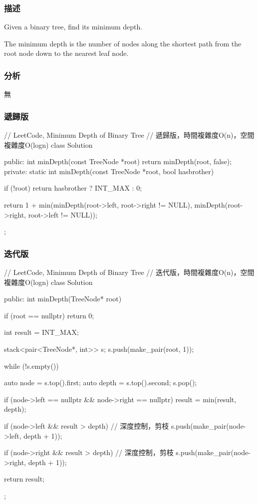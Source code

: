 \subsubsection{描述}
Given a binary tree, find its minimum depth.

The minimum depth is the number of nodes along the shortest path from the root node down to the nearest leaf node.


\subsubsection{分析}
無


\subsubsection{遞歸版}
\begin{Code}
// LeetCode, Minimum Depth of Binary Tree
// 遞歸版，時間複雜度O(n)，空間複雜度O(logn)
class Solution {
public:
    int minDepth(const TreeNode *root) {
        return minDepth(root, false);
    }
private:
    static int minDepth(const TreeNode *root, bool hasbrother) {
        if (!root) return hasbrother ? INT_MAX : 0;

        return 1 + min(minDepth(root->left, root->right != NULL),
                minDepth(root->right, root->left != NULL));
    }
};
\end{Code}


\subsubsection{迭代版}
\begin{Code}
// LeetCode, Minimum Depth of Binary Tree
// 迭代版，時間複雜度O(n)，空間複雜度O(logn)
class Solution {
public:
    int minDepth(TreeNode* root) {
        if (root == nullptr)
            return 0;

        int result = INT_MAX;

        stack<pair<TreeNode*, int>> s;
        s.push(make_pair(root, 1));

        while (!s.empty()) {
            auto node = s.top().first;
            auto depth = s.top().second;
            s.pop();

            if (node->left == nullptr && node->right == nullptr)
                result = min(result, depth);

            if (node->left && result > depth) // 深度控制，剪枝
                s.push(make_pair(node->left, depth + 1));

            if (node->right && result > depth) // 深度控制，剪枝
                s.push(make_pair(node->right, depth + 1));
        }

        return result;
    }
};
\end{Code}

